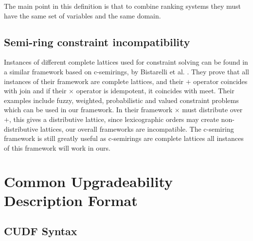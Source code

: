 The main point in this definition is that to combine ranking systems they must have the same set of variables 
and the same domain.

\subsection{Semi-ring constraint incompatibility}
Instances of different complete lattices used for constraint solving can be found in a similar framework based on c-semirings, 
by Bistarelli et al. \cite{Bistarelli1997}.
They prove that all instances of their framework are complete lattices, and their $+$ operator coincides with join
and if their $\times$ operator is idempotent, it coincides with meet.
Their examples include fuzzy, weighted, probabilistic and valued constraint problems which can be used in our framework.
In their framework $\times$ must distribute over $+$, this gives a distributive lattice,
since lexicographic orders may create non-distributive lattices, our overall frameworks are incompatible.
The c-semiring framework is still greatly useful as c-semirings are complete lattices all instances of this framework will work in ours.



\section{Common Upgradeability Description Format}
\label{form.cudf}

{}\cite{treinen2009common}



\subsection{CUDF Syntax}

